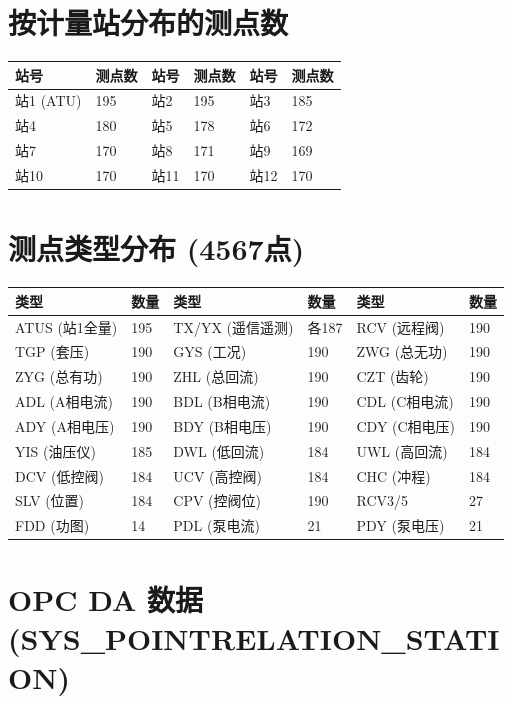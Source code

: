 \documentclass[12pt,a4paper]{ctexart}
\begin{document}
\section{按计量站分布的测点数}

\begin{table}[H]\centering
\begin{tabular}{p{2cm}p{2cm}p{2cm}p{2cm}p{2cm}p{2cm}}
\toprule
\textbf{站号} & \textbf{测点数} & \textbf{站号} & \textbf{测点数} & \textbf{站号} & \textbf{测点数} \\
\midrule
站1 (ATU) & 195 & 站2 & 195 & 站3 & 185 \\
站4 & 180 & 站5 & 178 & 站6 & 172 \\
站7 & 170 & 站8 & 171 & 站9 & 169 \\
站10 & 170 & 站11 & 170 & 站12 & 170 \\
\bottomrule
\end{tabular}
\end{table}

\section{测点类型分布 (4567点)}

\begin{longtable}{p{3cm}p{3cm}p{3cm}p{3cm}p{3cm}}
\toprule
\textbf{类型} & \textbf{数量} & \textbf{类型} & \textbf{数量} & \textbf{类型} & \textbf{数量} \\
\midrule
ATUS (站1全量) & 195 & TX/YX (遥信遥测) & 各187 & RCV (远程阀) & 190 \\
TGP (套压) & 190 & GYS (工况) & 190 & ZWG (总无功) & 190 \\
ZYG (总有功) & 190 & ZHL (总回流) & 190 & CZT (齿轮) & 190 \\
ADL (A相电流) & 190 & BDL (B相电流) & 190 & CDL (C相电流) & 190 \\
ADY (A相电压) & 190 & BDY (B相电压) & 190 & CDY (C相电压) & 190 \\
YIS (油压仪) & 185 & DWL (低回流) & 184 & UWL (高回流) & 184 \\
DCV (低控阀) & 184 & UCV (高控阀) & 184 & CHC (冲程) & 184 \\
SLV (位置) & 184 & CPV (控阀位) & 190 & RCV3/5 & 27 \\
FDD (功图) & 14 & PDL (泵电流) & 21 & PDY (泵电压) & 21 \\
\bottomrule
\end{longtable}

\section{OPC DA 数据 (SYS\_POINTRELATION\_STATION)}
\end{document}

